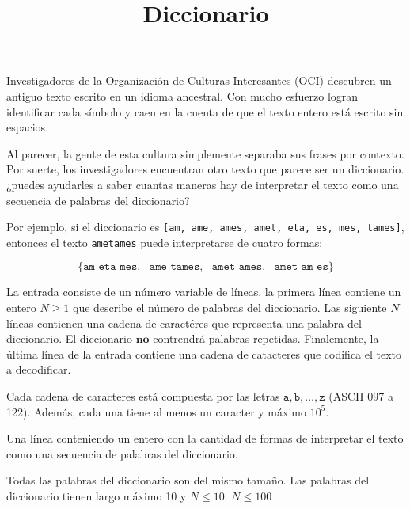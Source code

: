 \documentclass{oci}
\title{Diccionario}
\begin{document}
\begin{problemDescription}
Investigadores de la Organización de Culturas Interesantes (OCI) descubren un antiguo texto escrito en un idioma ancestral. Con mucho esfuerzo logran identificar cada símbolo y caen en la cuenta de que el texto entero está escrito sin espacios.

Al parecer, la gente de esta cultura simplemente separaba sus frases por contexto. Por suerte, los investigadores encuentran otro texto que parece ser un diccionario. ¿puedes ayudarles a saber cuantas maneras hay de interpretar el texto como una secuencia de palabras del diccionario?

Por ejemplo, si el diccionario es \texttt{[am, ame, ames, amet, eta, es, mes, tames]}, entonces el texto \texttt{ametames} puede interpretarse de cuatro formas: 

$$\{\texttt{am eta mes},\ \ \  \texttt{ame tames},\ \ \  \texttt{amet ames},\ \ \  \texttt{amet am es}  \}$$


\end{problemDescription}

\begin{inputDescription}
La entrada consiste de un número variable de líneas. la primera línea contiene un entero $N \geq 1$ que describe el número de palabras del diccionario. Las siguiente $N$ líneas contienen una cadena de caractéres que representa una palabra del diccionario. El diccionario $\textbf{no}$ contrendrá palabras repetidas. Finalemente, la última línea de la entrada contiene una cadena de catacteres que codifica el texto a decodificar. 

Cada cadena de caracteres está compuesta por las letras $\texttt{a},\texttt{b},\dots,\texttt{z}$ (ASCII 097 a 122). Además, cada una tiene al menos un caracter y máximo $10^5$.
\end{inputDescription}

\begin{outputDescription}
Una línea conteniendo un entero con la cantidad de formas de interpretar el texto como una secuencia de palabras del diccionario.
\end{outputDescription}

\begin{scoreDescription}
   Todas las palabras del diccionario son del mismo tamaño. 
   Las palabras del diccionario tienen largo máximo 10 y $N \leq 10$.
   $N \leq 100$
\end{scoreDescription}

\begin{sampleDescription}
\end{sampleDescription}
\end{document}
